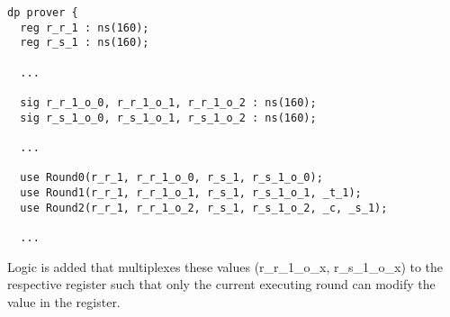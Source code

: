 \begin{lstlisting}[language=GEZEL]
dp prover {
  reg r_r_1 : ns(160);
  reg r_s_1 : ns(160);
  
  ...
  
  sig r_r_1_o_0, r_r_1_o_1, r_r_1_o_2 : ns(160);
  sig r_s_1_o_0, r_s_1_o_1, r_s_1_o_2 : ns(160);
  
  ...
  
  use Round0(r_r_1, r_r_1_o_0, r_s_1, r_s_1_o_0);
  use Round1(r_r_1, r_r_1_o_1, r_s_1, r_s_1_o_1, _t_1);
  use Round2(r_r_1, r_r_1_o_2, r_s_1, r_s_1_o_2, _c, _s_1);

  ...
\end{lstlisting}

Logic is added that multiplexes these values (r\_r\_1\_o\_x,
r\_s\_1\_o\_x) to the respective register such that only the current
executing round can modify the value in the register.

